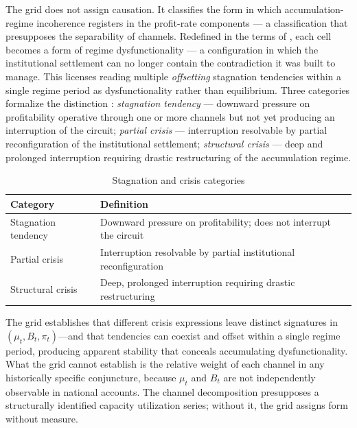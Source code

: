 \documentclass[11pt,a4paper]{article}
\begin{document}
{The grid does not assign causation. It classifies the form in which 
accumulation-regime incoherence registers in the profit-rate 
components --- a classification that presupposes the separability 
of channels. Redefined in the terms of \citet{Vidal2014}, each cell 
becomes a form of regime dysfunctionality --- a configuration in 
which the institutional settlement can no longer contain the 
contradiction it was built to manage. This licenses reading multiple 
\textit{offsetting} stagnation tendencies within a single regime 
period as dysfunctionality rather than equilibrium. Three categories 
formalize the distinction \citep{Vidal2014, Vidal2019}: 
\textit{stagnation tendency} --- downward pressure on profitability 
operative through one or more channels but not yet producing an 
interruption of the circuit; \textit{partial crisis} --- interruption 
resolvable by partial reconfiguration of the institutional settlement; 
\textit{structural crisis} --- deep and prolonged interruption 
requiring drastic restructuring of the accumulation regime.


\begin{table}[htbp]
	\centering
	\caption{Stagnation and crisis categories}
	\label{tab:vidal_categories}
	{\small
		\begin{tabular}{ll}
			\toprule
			Category & Definition \\
			\midrule
			Stagnation tendency & Downward pressure on profitability; does not interrupt the circuit \\
			Partial crisis      & Interruption resolvable by partial institutional reconfiguration \\
			Structural crisis   & Deep, prolonged interruption requiring drastic restructuring \\
			\bottomrule
	\end{tabular}}
\end{table}

The grid establishes that different crisis expressions leave distinct signatures in $(\mu_t, B_t, \pi_t)$---and that tendencies can coexist and offset within a single regime period, producing apparent stability that conceals accumulating dysfunctionality. What the grid cannot establish is the relative weight of each channel in any historically specific conjuncture, because $\mu_t$ and $B_t$ are not independently observable in national accounts. The channel decomposition presupposes a structurally identified capacity utilization series; without it, the grid assigns form without measure.


}
\end{document}
